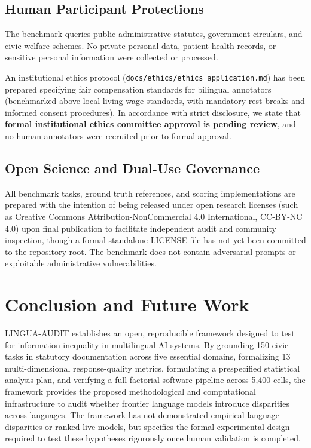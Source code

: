 \documentclass[11pt,a4paper]{article}
\begin{document}
\subsection{Human Participant Protections}
\label{sec:ethics_protections}

The benchmark queries public administrative statutes, government circulars, and civic welfare schemes. No private personal data, patient health records, or sensitive personal information were collected or processed.

An institutional ethics protocol (\texttt{docs/ethics/ethics\_application.md}) has been prepared specifying fair compensation standards for bilingual annotators (benchmarked above local living wage standards, with mandatory rest breaks and informed consent procedures). In accordance with strict disclosure, we state that \textbf{formal institutional ethics committee approval is pending review}, and no human annotators were recruited prior to formal approval.

\subsection{Open Science and Dual-Use Governance}
\label{sec:open_science}

All benchmark tasks, ground truth references, and scoring implementations are prepared with the intention of being released under open research licenses (such as Creative Commons Attribution-NonCommercial 4.0 International, CC-BY-NC 4.0) upon final publication to facilitate independent audit and community inspection, though a formal standalone LICENSE file has not yet been committed to the repository root. The benchmark does not contain adversarial prompts or exploitable administrative vulnerabilities.

\section{Conclusion and Future Work}
\label{sec:conclusion}

LINGUA-AUDIT establishes an open, reproducible framework designed to test for information inequality in multilingual AI systems. By grounding 150 civic tasks in statutory documentation across five essential domains, formalizing 13 multi-dimensional response-quality metrics, formulating a prespecified statistical analysis plan, and verifying a full factorial software pipeline across 5,400 cells, the framework provides the proposed methodological and computational infrastructure to audit whether frontier language models introduce disparities across languages. The framework has not demonstrated empirical language disparities or ranked live models, but specifies the formal experimental design required to test these hypotheses rigorously once human validation is completed.
\end{document}
